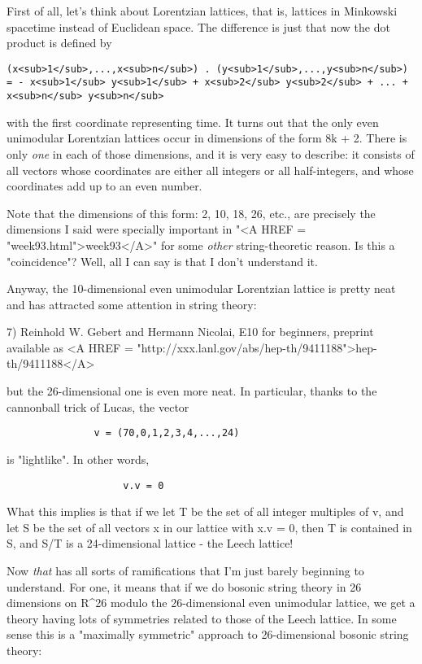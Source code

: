 First of all, let's think about Lorentzian lattices, that is,
lattices in Minkowski spacetime instead of Euclidean space.  
The difference is just that now the dot product is defined by

\begin{verbatim}
(x<sub>1</sub>,...,x<sub>n</sub>) . (y<sub>1</sub>,...,y<sub>n</sub>) = - x<sub>1</sub> y<sub>1</sub> + x<sub>2</sub> y<sub>2</sub> + ... + x<sub>n</sub> y<sub>n</sub>
\end{verbatim}
    
with the first coordinate representing time.  It turns out that
the only even unimodular Lorentzian lattices occur in dimensions
of the form 8k + 2.  There is only \emph{one} in each of those dimensions,
and it is very easy to describe: it consists of all vectors whose
coordinates are either all integers or all half-integers, and whose
coordinates add up to an even number.  

Note that the dimensions of this form: 2, 10, 18, 26, etc., are 
precisely the dimensions I said were specially important in "<A HREF = "week93.html">week93</A>" 
for some \emph{other} string-theoretic reason.  Is this a "coincidence"?
Well, all I can say is that I don't understand it.

Anyway, the 10-dimensional even unimodular Lorentzian lattice
is pretty neat and has attracted some attention in string theory:

7) Reinhold W. Gebert and Hermann Nicolai, E10 for beginners,
preprint available as <A HREF = "http://xxx.lanl.gov/abs/hep-th/9411188">hep-th/9411188</A> 

but the 26-dimensional one is even more neat.  In particular,
thanks to the cannonball trick of Lucas, the vector

\begin{verbatim}
               v = (70,0,1,2,3,4,...,24)
\end{verbatim}
    
is "lightlike".  In other words, 

\begin{verbatim}
                    v.v = 0 
\end{verbatim}
    
What this implies is that if we let T be the set of all integer
multiples of v, and let S be the set of all vectors x in our lattice
with x.v = 0, then T is contained in S, and S/T is a 24-dimensional
lattice - the Leech lattice!

Now \emph{that} has all sorts of ramifications that I'm just barely 
beginning to understand.   For one, it means that if we do bosonic 
string theory in 26 dimensions on R^{26} modulo the 26-dimensional even 
unimodular lattice, we get a theory having lots of symmetries related 
to those of the Leech lattice.  In some sense this is a "maximally 
symmetric" approach to 26-dimensional bosonic string theory:

